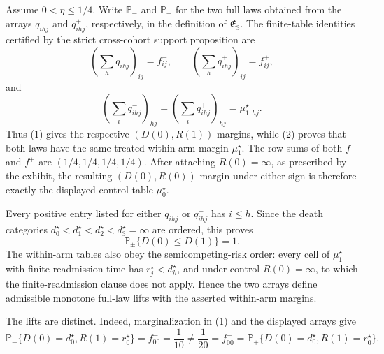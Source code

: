 Assume \(0<\eta\leq 1/4\).  Write \(\mathbb P_-\) and \(\mathbb P_+\) for the two full laws obtained from the arrays \(q^-_{ihj}\) and \(q^+_{ihj}\), respectively, in the definition of \(\mathfrak E_3\).  The finite-table identities certified by the strict cross-cohort support proposition are
\[
 \left(\sum_h q^-_{ihj}\right)_{ij}=f^-_{ij},\qquad
 \left(\sum_h q^+_{ihj}\right)_{ij}=f^+_{ij},
 \tag{1}
\]
and
\[
 \left(\sum_i q^-_{ihj}\right)_{hj}
 =\left(\sum_i q^+_{ihj}\right)_{hj}
 =\mu_{1,hj}^{\star}.
 \tag{2}
\]
Thus (1) gives the respective \((D(0),R(1))\)-margins, while (2) proves that both laws have the same treated within-arm margin \(\mu_1^\star\).  The row sums of both \(f^-\) and \(f^+\) are \((1/4,1/4,1/4,1/4)\).  After attaching \(R(0)=\infty\), as prescribed by the exhibit, the resulting \((D(0),R(0))\)-margin under either sign is therefore exactly the displayed control table \(\mu_0^\star\).

Every positive entry listed for either \(q^-_{ihj}\) or \(q^+_{ihj}\) has \(i\leq h\).  Since the death categories \(d_0^\star<d_1^\star<d_2^\star<d_3^\star=\infty\) are ordered, this proves
\[
 \mathbb P_\pm\{D(0)\leq D(1)\}=1.
 \tag{3}
\]
The within-arm tables also obey the semicompeting-risk order: every cell of \(\mu_1^\star\) with finite readmission time has \(r_j^\star<d_h^\star\), and under control \(R(0)=\infty\), to which the finite-readmission clause does not apply.  Hence the two arrays define admissible monotone full-law lifts with the asserted within-arm margins.

The lifts are distinct.  Indeed, marginalization in (1) and the displayed arrays give
\[
 \mathbb P_-\{D(0)=d_0^\star,R(1)=r_0^\star\}
 =f^-_{00}=\frac{1}{10}
 \neq \frac{1}{20}=f^+_{00}
 =\mathbb P_+\{D(0)=d_0^\star,R(1)=r_0^\star\}.
 \tag{4}
\]

